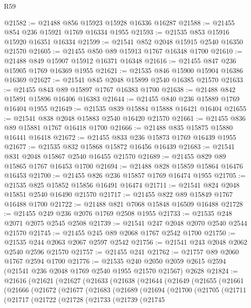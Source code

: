 \begin{lexlean}{R59}
\begin{coremodule}
@21582 := @21488 @856 @15923 @15928 @16336 @16287
@21588 := @21455 @854 @236 @15921 @1769 @16334 @1955
@21593 := @21535 @853 @15916 @15920 @16351 @16334
@21599 := @21541 @852 @2048 @15915 @2540 @16350 @21570
@21605 := @21455 @850 @89 @15913 @1767 @16348 @1700
@21610 := @21488 @849 @15907 @15912 @16371 @16348
@21616 := @21455 @847 @236 @15905 @1769 @16369 @1955
@21621 := @21535 @846 @15900 @15904 @16386 @16369
@21627 := @21541 @845 @2048 @15899 @2540 @16385 @21570
@21633 := @21455 @843 @89 @15897 @1767 @16383 @1700
@21638 := @21488 @842 @15891 @15896 @16406 @16383
@21644 := @21455 @840 @236 @15889 @1769 @16404 @1955
@21649 := @21535 @839 @15884 @15888 @16421 @16404
@21655 := @21541 @838 @2048 @15883 @2540 @16420 @21570
@21661 := @21455 @836 @89 @15881 @1767 @16418 @1700
@21666 := @21488 @835 @15875 @15880 @16441 @16418
@21672 := @21455 @833 @236 @15873 @1769 @16439 @1955
@21677 := @21535 @832 @15868 @15872 @16456 @16439
@21683 := @21541 @831 @2048 @15867 @2540 @16455 @21570
@21689 := @21455 @829 @89 @15865 @1767 @16453 @1700
@21694 := @21488 @828 @15859 @15864 @16476 @16453
@21700 := @21455 @826 @236 @15857 @1769 @16474 @1955
@21705 := @21535 @825 @15852 @15856 @16491 @16474
@21711 := @21541 @824 @2048 @15851 @2540 @16490 @21570
@21717 := @21455 @822 @89 @15849 @1767 @16488 @1700
@21722 := @21488 @821 @7068 @15848 @16509 @16488
@21728 := @21455 @249 @236 @2076 @1769 @2508 @1955
@21733 := @21535 @248 @2071 @2075 @2545 @2508
@21739 := @21541 @247 @2048 @2070 @2540 @2544 @21570
@21745 := @21455 @245 @89 @2068 @1767 @2542 @1700
@21750 := @21535 @244 @2063 @2067 @2597 @2542
@21756 := @21541 @243 @2048 @2062 @2540 @2596 @21570
@21757 := @21455 @241
@21762 := @21757 @89 @2060 @1767 @2594 @1700
@21776 := @21535
    @240
    @2050
    @2059
    @2615
    @2594
    (@21541 @236 @2048 @1769 @2540 @1955 @21570 @21567)
    @2628
@21824 := @21616
    (@21621
      (@21627
        (@21633
          (@21638
            (@21644
              (@21649
                (@21655
                  (@21661
                    (@21666
                      (@21672
                        (@21677
                          (@21683
                            (@21689
                              (@21694
                                (@21700
                                  (@21705
                                    (@21711
                                      (@21717
                                        (@21722
                                          (@21728
                                            (@21733
                                              (@21739
                                                (@21745

\end{coremodule}
\end{lexlean}

